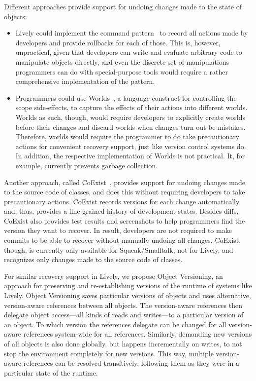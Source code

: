 Different approaches provide support for undoing changes made to the state of objects:
\begin{itemize}
    \item Lively could implement the command pattern~\cite{GammaHelmJohnsonVlissides95} to record all actions made by developers and provide rollbacks for each of those. This is, however, unpractical, given that developers can write and evaluate arbitrary code to manipulate objects directly, and even the discrete set of manipulations programmers can do with special-purpose tools would require a rather comprehensive implementation of the pattern.
    \item Programmers could use Worlds~\cite{Warth2011Wor}, a language construct for controlling the scope side-effects, to capture the effects of their actions into different worlds. Worlds as such, though, would require developers to explicitly create worlds before their changes and discard worlds when changes turn out be mistakes. Therefore, worlds would require the programmer to do take precautionary actions for convenient recovery support, just like version control systems do. In addition, the respective implementation of Worlds is not practical. It, for example, currently prevents garbage collection.
\end{itemize}

Another approach, called CoExist~\cite{Steinert2012COE}, provides support for undoing changes made to the source code of classes, and does this without requiring developers to take precautionary actions.
CoExist records versions for each change automatically and, thus, provides a fine-grained history of development states.
Besides diffs, CoExist also provides test results and screenshots to help programmers find the version they want to recover.
In result, developers are not required to make commits to be able to recover without manually undoing all changes.
CoExist, though, is currently only available for Squeak/Smalltalk, not for Lively, and recognizes only changes made to the source code of classes.

For similar recovery support in Lively, we propose Object Versioning, an approach for preserving and re-establishing versions of the runtime of systems like Lively.
Object Versioning saves particular versions of objects and uses alternative, version-aware references between all objects.
The version-aware references then delegate object access---all kinds of reads and writes---to a particular version of an object.
To which version the references delegate can be changed for all version-aware references system-wide for all references.
Similarly, demanding new versions of all objects is also done globally, but happens incrementally on writes, to not stop the environment completely for new versions.
This way, multiple version-aware references can be resolved transitively, following them as they were in a particular state of the runtime.

